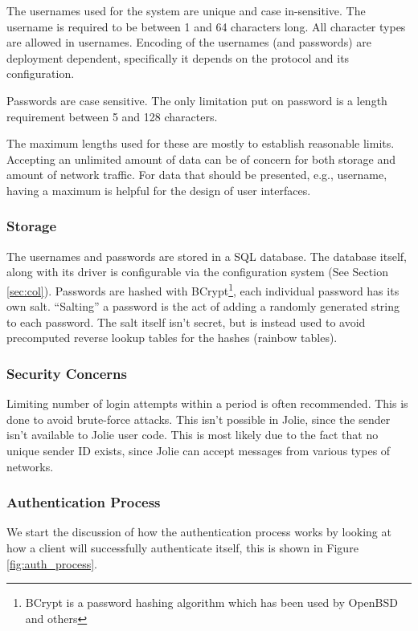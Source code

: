 The usernames used for the system are unique and case in-sensitive. The
username is required to be between 1 and 64 characters long. All character
types are allowed in usernames. Encoding of the usernames (and passwords) are
deployment dependent, specifically it depends on the protocol and its
configuration.

Passwords are case sensitive. The only limitation put on password is a length
requirement between 5 and 128 characters.

The maximum lengths used for these are mostly to establish reasonable limits.
Accepting an unlimited amount of data can be of concern for both storage and
amount of network traffic. For data that should be presented, e.g., username,
having a maximum is helpful for the design of user interfaces.

\subsubsection*{Storage}

The usernames and passwords are stored in a SQL database. The database itself,
along with its driver is configurable via the configuration system (See
Section \ref{sec:col}). Passwords are hashed with
BCrypt\footnote{BCrypt is a password hashing algorithm which has been used
by OpenBSD and others}\cite{provos1999future}, each individual password has
its own salt. ``Salting'' a password is the act of adding a randomly
generated string to each password. The salt itself isn't secret,
but is instead used to avoid precomputed reverse lookup tables for
the hashes (rainbow tables).

\subsubsection*{Security Concerns}

Limiting number of login attempts within a period is often recommended. This is
done to avoid brute-force attacks. This isn't possible in Jolie, since the
sender isn't available to Jolie user code. This is most likely due to the fact
that no unique sender ID exists, since Jolie can accept messages from various
types of networks.

\subsubsection*{Authentication Process}

We start the discussion of how the authentication process works by looking at
how a client will successfully authenticate itself, this is shown in Figure
\ref{fig:auth_process}.

